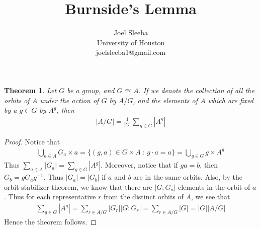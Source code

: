 \documentclass[11pt]{article}
\theoremstyle{plain} %
\newtheorem{theorem}{Theorem}[section]
\theoremstyle{definition} %
\theoremstyle{remark} %
\begin{document}
\title{Burnside's Lemma}

\author{
  Joel Sleeba \\
  University of Houston \\
  joelsleeba1@gmail.com \\
}

\maketitle

\begin{theorem}
  Let $G$ be a group, and $G \curvearrowright A$. If we denote the
  collection of all the orbits of $A$ under the action of $G$ by
  $A/G$, and the elements of $A$ which are fixed by a $g \in G$ by $A^g$, then
  \begin{align*}
    |A/G| = \frac{1}{|G|} \sum_{ g \in G} |A^g|
  \end{align*}
\end{theorem}
\begin{proof}
  Notice that
  \begin{align*}
    \bigcup_{a \in A} G_a \times a = \{ (g, a) \in G \times A  \ : \
    g \cdot a = a \}  = \bigcup_{g \in G} g \times A^g
  \end{align*}
  Thus $\sum_{a \in A} |G_a| = \sum_{g \in G} |A^g|$. Moreover,
  notice that if $ga = b$, then $G_b = gG_a g^{-1}$. Thus $|G_a| =
  |G_b|$ if $a$ and $ b$ are in the same orbits. Also, by the
  orbit-stabilizer theorem, we know that there are $|G:G_a|$ elements
  in the orbit of $a$. Thus for each representative $r$ from the
  distinct orbits of $A$, we see that
  \begin{align*}
    \sum_{g \in G} |A^g| = \sum_{r \in A/G}|G_r||G:G_r| = \sum_{r \in
    A/G} |G| = |G| |A/G|
  \end{align*}
  Hence the theorem follows.
\end{proof}

\printbibliography[heading=bibintoc]
\end{document}
